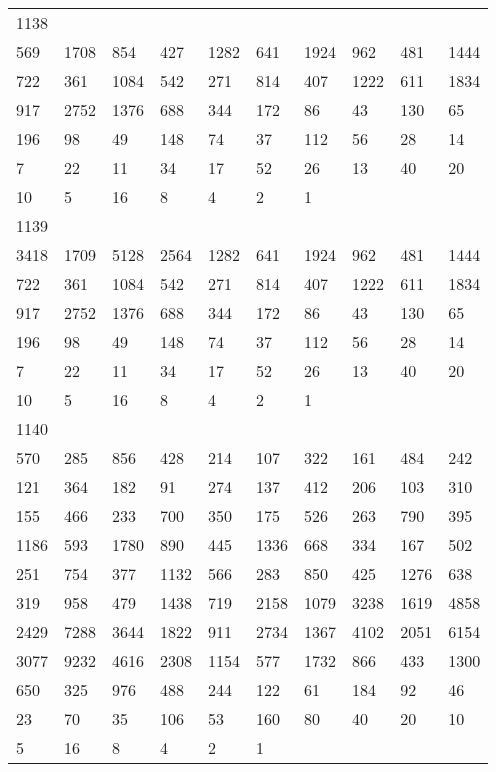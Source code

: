 \begin{longtable}{*{10}{l}}
1138&&&&&&&&&\\
569& 1708& 854& 427& 1282& 641& 1924& 962& 481& 1444\\
722& 361& 1084& 542& 271& 814& 407& 1222& 611& 1834\\
917& 2752& 1376& 688& 344& 172& 86& 43& 130& 65\\
196& 98& 49& 148& 74& 37& 112& 56& 28& 14\\
7& 22& 11& 34& 17& 52& 26& 13& 40& 20\\
10& 5& 16& 8& 4& 2& 1& \\

1139&&&&&&&&&\\
3418& 1709& 5128& 2564& 1282& 641& 1924& 962& 481& 1444\\
722& 361& 1084& 542& 271& 814& 407& 1222& 611& 1834\\
917& 2752& 1376& 688& 344& 172& 86& 43& 130& 65\\
196& 98& 49& 148& 74& 37& 112& 56& 28& 14\\
7& 22& 11& 34& 17& 52& 26& 13& 40& 20\\
10& 5& 16& 8& 4& 2& 1& \\

1140&&&&&&&&&\\
570& 285& 856& 428& 214& 107& 322& 161& 484& 242\\
121& 364& 182& 91& 274& 137& 412& 206& 103& 310\\
155& 466& 233& 700& 350& 175& 526& 263& 790& 395\\
1186& 593& 1780& 890& 445& 1336& 668& 334& 167& 502\\
251& 754& 377& 1132& 566& 283& 850& 425& 1276& 638\\
319& 958& 479& 1438& 719& 2158& 1079& 3238& 1619& 4858\\
2429& 7288& 3644& 1822& 911& 2734& 1367& 4102& 2051& 6154\\
3077& 9232& 4616& 2308& 1154& 577& 1732& 866& 433& 1300\\
650& 325& 976& 488& 244& 122& 61& 184& 92& 46\\
23& 70& 35& 106& 53& 160& 80& 40& 20& 10\\
5& 16& 8& 4& 2& 1& \\


\end{longtable}
